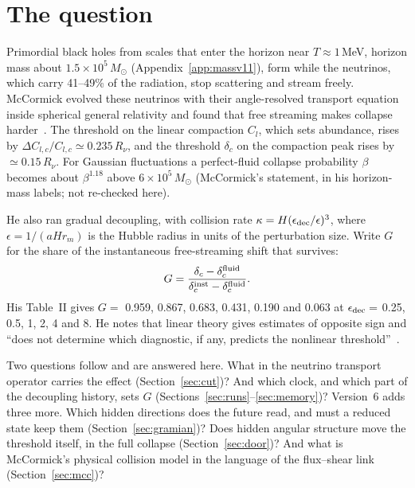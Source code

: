 \documentclass[11pt]{article}
\begin{document}
\section{The question}

Primordial black holes from scales that enter the horizon near $T\approx1$\,MeV, horizon mass about $1.5\times10^5\,M_\odot$ (Appendix~\ref{app:massv11}), form while the neutrinos, which carry 41--49\% of the radiation, stop scattering and stream freely. McCormick evolved these neutrinos with their angle-resolved transport equation inside spherical general relativity and found that free streaming makes collapse harder~\cite{McC}. The threshold on the linear compaction $C_l$, which sets abundance, rises by $\Delta C_{l,c}/C_{l,c}\simeq0.235\,R_\nu$, and the threshold $\delta_c$ on the compaction peak rises by $\simeq0.15\,R_\nu$. For Gaussian fluctuations a perfect-fluid collapse probability $\beta$ becomes about $\beta^{1.18}$ above $6\times10^5\,M_\odot$ (McCormick's statement, in his horizon-mass labels; not re-checked here).

He also ran gradual decoupling, with collision rate $\kappa=H(\epsilon_{\rm dec}/\epsilon)^3$, where $\epsilon=1/(aHr_m)$ is the Hubble radius in units of the perturbation size. Write $G$ for the share of the instantaneous free-streaming shift that survives:
\begin{equation}
G=\frac{\delta_c-\delta_c^{\rm fluid}}{\delta_c^{\rm inst}-\delta_c^{\rm fluid}}.
\end{equation}
His Table~II gives $G=$ 0.959, 0.867, 0.683, 0.431, 0.190 and 0.063 at $\epsilon_{\rm dec}=$ 0.25, 0.5, 1, 2, 4 and 8. He notes that linear theory gives estimates of opposite sign and ``does not determine which diagnostic, if any, predicts the nonlinear threshold''~\cite[Sec.~IV\,C]{McC}.

Two questions follow and are answered here. What in the neutrino transport operator carries the effect (Section~\ref{sec:cut})? And which clock, and which part of the decoupling history, sets $G$ (Sections~\ref{sec:runs}--\ref{sec:memory})? Version~6 adds three more. Which hidden directions does the future read, and must a reduced state keep them (Section~\ref{sec:gramian})? Does hidden angular structure move the threshold itself, in the full collapse (Section~\ref{sec:door})? And what is McCormick's physical collision model in the language of the flux--shear link (Section~\ref{sec:mcc})?




\end{document}
